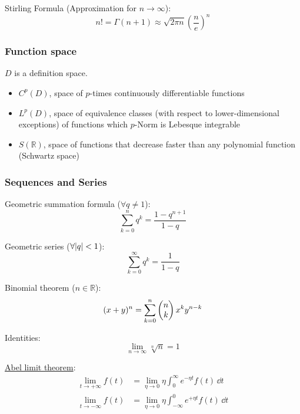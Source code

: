 			\noindent
			Stirling Formula (Approximation for $n\rightarrow\infty$):
			\begin{equation}
				n! = \Gamma(n+1) \approx \sqrt{2\pi n} \left( \frac{n}{e} \right)^{n}
			\end{equation}


		\subsubsection{Function space}
			\noindent
			$D$ is a definition space.
			\begin{itemize}
				\item $C^p(D)$, space of $p$-times continuously differentiable functions
				\item $L^p(D)$, space of equivalence classes (with respect to lower-dimensional exceptions) of functions which $p$-Norm is Lebesque integrable
				\item $S(\mathbb{R})$, space of functions that decrease faster than any polynomial function (Schwartz space)
			\end{itemize}

		\subsubsection{Sequences and Series}
			\noindent
			Geometric summation formula ($\forall q \ne 1$):
			\begin{equation}
				\sum_{k=0}^n q^k=\frac{1-q^{n+1}}{1-q}
			\end{equation}

			\noindent
			Geometric series ($\forall \abs{q} < 1$):
			\begin{equation}
				\sum_{k=0}^\infty q^k= \frac{1}{1-q}
			\end{equation}

			\noindent
			Binomial theorem ($n\in\mathbb{R}$):
			\begin{equation}
				(x+y)^n=\sum_{k=0}^{n}\left(\begin{matrix}n\\k\end{matrix}\right)x^k y^{n-k}
			\end{equation}

			\noindent
			Identities:
			\begin{equation}
				\lim_{n\rightarrow\infty} \sqrt[n]{n} = 1
			\end{equation}

			\noindent
			\href{https://en.wikipedia.org/wiki/Abel%27s_theorem}{Abel limit theorem}\index{Abel!Grenzwertsatz}:
			\begin{equation}
				\begin{aligned}
					\lim_{t\rightarrow+\infty} f(t) &= \lim_{\eta\rightarrow 0} \eta \int_0^\infty e^{-\eta t} f(t) \,\dd t \\
					\lim_{t\rightarrow-\infty} f(t) &= \lim_{\eta\rightarrow 0} \eta \int_{-\infty}^{0} e^{+\eta t} f(t) \,\dd t \\
				\end{aligned}
			\end{equation}

